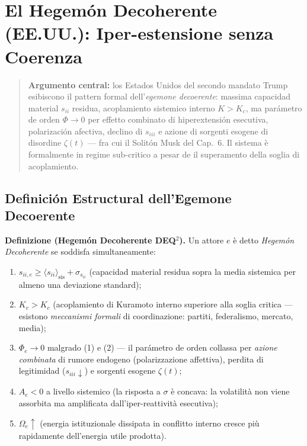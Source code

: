 \chapter{El Hegemón Decoherente (EE.UU.): Iper-estensione senza
Coerenza}\label{legemone-decoerente-usa-hiperextensión-senza-coerenza}

\begin{quote}
\textbf{Argumento central:} los Estados Unidos del secondo mandato Trump
esibiscono il pattern formal dell'\emph{egemone decoerente}: massima
capacidad material \(s_{ii}\) residua, acoplamiento sistemico interno
\(K > K_c\), ma parámetro de orden \(\Phi \to 0\) per effetto combinato
di hiperextensión esecutiva, polarización afectiva, declino di
\(s_{iii}\) e azione di sorgenti esogene di disordine \(\zeta(t)\) ---
fra cui il Solitón Musk del Cap.~6. Il sistema è formalmente in regime
sub-critico a pesar de il superamento della soglia di acoplamiento.
\end{quote}



\section{Definición Estructural dell'Egemone
Decoerente}\label{definición-estructural-dellegemone-decoerente}

\Hypoth{} \textbf{Definizione (Hegemón Decoherente DEQ$^2$).} Un attore
\(e\) è detto \emph{Hegemón Decoherente} se soddisfa simultaneamente:

\begin{enumerate}
\def\labelenumi{\arabic{enumi}.}
\tightlist
\item
  \(s_{ii,e} \geq \langle s_{ii} \rangle_{\text{sis}} + \sigma_{s_{ii}}\)
  (capacidad material residua sopra la media sistemica per almeno una
  deviazione standard);
\item
  \(K_e > K_c\) (acoplamiento di Kuramoto interno superiore alla soglia
  critica --- esistono \emph{meccanismi formali} di coordinazione:
  partiti, federalismo, mercato, media);
\item
  \(\Phi_e \to 0\) malgrado (1) e (2) --- il parámetro de orden collassa
  per \emph{azione combinata} di rumore endogeno (polarizzazione
  affettiva), perdita di legitimidad (\(s_{iii} \downarrow\)) e sorgenti
  esogene \(\zeta(t)\);
\item
  \(A_e < 0\) a livello sistemico (la risposta a \(\sigma\) è concava:
  la volatilità non viene assorbita ma amplificata dall'iper-reattività
  esecutiva);
\item
  \(\Omega_e \uparrow\) (energia istituzionale dissipata in conflitto
  interno cresce più rapidamente dell'energia utile prodotta).
\end{enumerate}

